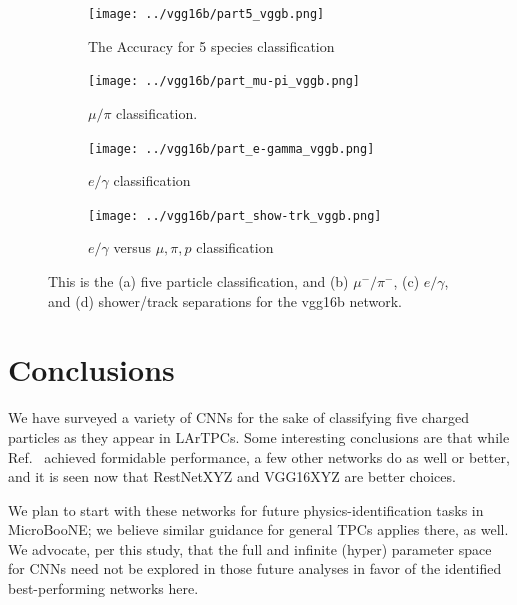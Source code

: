 \documentclass[11pt,a4paper]{article}
\begin{document}
\begin{figure}[t]
  \centering  
\begin{subfigure}[t]{0.45\textwidth}
\centering
\texttt{[image: ../vgg16b/part5\_vggb.png]}
\label{a}
\caption{The Accuracy for 5 species classification}
\end{subfigure}%
\hfill
\begin{subfigure}[t]{0.45\textwidth}
\centering
\texttt{[image: ../vgg16b/part\_mu-pi\_vggb.png]}
\label{b}
\caption{$\mu/\pi$ classification.}
\end{subfigure}%

\bigskip

\begin{subfigure}[t]{0.45\textwidth}
\centering
\texttt{[image: ../vgg16b/part\_e-gamma\_vggb.png]}
\label{c}
\caption{$e/\gamma$ classification}
\end{subfigure}%
\hfill
\begin{subfigure}[t]{0.45\textwidth}
\centering
\texttt{[image: ../vgg16b/part\_show-trk\_vggb.png]}
\label{d}
\caption{$e/\gamma$ versus $\mu,\pi,p$ classification}
\end{subfigure}%
\caption{This is the (a) five particle classification, and (b) $\mu^-/\pi^-$, (c) $e/\gamma$, and (d) shower/track separations for the vgg16b network.}
\label{fig:vgg16b}
\end{figure}


\section {Conclusions}

We have surveyed a variety of CNNs for the sake of classifying five charged particles as they appear in LArTPCs. Some interesting conclusions are that while Ref.~\cite{uB-JINST} achieved formidable performance, a few other networks do as well or better, and it is seen now that RestNetXYZ and VGG16XYZ are better choices.

We plan to start with these networks for future physics-identification tasks in MicroBooNE; we believe similar guidance for general TPCs applies there, as well. We advocate, per this study, that the full and infinite (hyper) parameter space for CNNs need not be explored in those future analyses in favor of the identified best-performing networks here.
\end{document}
